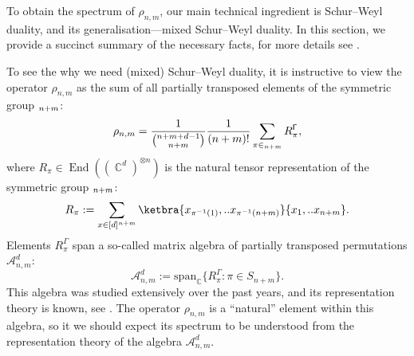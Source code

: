 \documentclass[aps,twocolumn,pra,superscriptaddress,nofootinbib]{revtex4-2}
\newcommand{\mA}{\mathcal{A}}
\newcommand{\xp}[1]{^{\otimes #1}}
\let\S\relax
\DeclareMathOperator{\S}{S} %
\DeclareMathOperator{\C}{\mathbb{C}} %
\DeclareMathOperator{\End}{End}
\begin{document}
To obtain the spectrum of $\rho_{n,m}$, our main technical ingredient is Schur--Weyl duality, and its generalisation---mixed Schur--Weyl duality. In this section, we provide a succinct summary of the necessary facts, for more details see \cite{grinko2023gt,grinko2025mixed}.

To see the why we need (mixed) Schur--Weyl duality, it is instructive to view the operator $\rho_{n,m}$ as the sum of all partially transposed elements of the symmetric group $\S_{n+m}$:
\begin{equation}
    \rho_{n,m} = \frac{1}{\binom{n+m+d-1}{n+m}} \frac{1}{(n+m)!}\sum_{\pi \in \S_{n+m}} R_\pi^{\mathsf{\Gamma}},
\end{equation}
where $R_\pi \in \End((\C^d)\xp{n})$ is the natural tensor representation of the symmetric group $\S_{n+m}$: 
\begin{equation}
    R_\pi := \sum_{x \in [d]^{n+m}} \ketbra{x_{\pi^{-1}(1)},..x_{\pi^{-1}(n+m)}}{{x_{1},..x_{n+m}}}.
\end{equation}
Elements $R_\pi^{\mathsf{\Gamma}}$ span a so-called matrix algebra of partially transposed permutations $\mA_{n,m}^d$: 
\begin{equation}
    \mA_{n,m}^d := \text{span}_{\mathbb{C}}\{ R_{\pi}^{\mathsf{\Gamma}}: \pi \in S_{n+m} \}.
\end{equation}
This algebra was studied extensively over the past years, and its representation theory is known, see \cite{grinko2023gt,grinko2025mixed,MozrzymasHorodeckiStudzinski2014Structure,StudzinskiHorodeckiMozrzymas2013Commutant,MozrzymasStudzinskiHorodecki2018SimplifiedFormalism,HorodeckiStudzinskiMozrzymas2025Iterative,MozrzymasHorodeckiStudzinski2024Frobenius,StudzinskiMylnikMozrzymasHorodeckiGrinko2025}.
The operator $\rho_{n,m}$ is a ``natural'' element within this algebra, so it we should expect its spectrum to be understood from the representation theory of the algebra $\mA_{n,m}^d$. 
\end{document}
